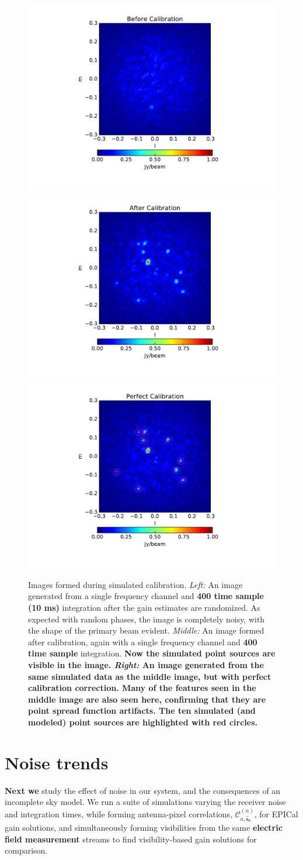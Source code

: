 \documentclass[a4paper,fleqn,usenatbib]{../mnras}
\newcommand{\spix}{\ensuremath{\hat{\mathbf{s}}_{0}}}
\newcommand{\Cna}[1][n]{\ensuremath{\mathcal{C}^{(#1)}_{a,\spix}}}
\begin{document}
\begin{figure}
\begin{center}
\includegraphics[width=.3\linewidth]{fig5a.pdf}
\includegraphics[width=.3\linewidth]{fig5b.pdf}
\includegraphics[width=.3\linewidth]{fig5c.pdf}
\caption{Images formed during simulated calibration. \emph{Left:} An image generated from a 
single frequency channel and \textbf{400 time sample (10 ms)} integration after the gain estimates are randomized. As 
expected with random phases, the image is completely noisy, with the shape of the primary 
beam evident. \emph{Middle:} An image formed after calibration, again with a single frequency 
channel and \textbf{400 time sample} integration. \textbf{Now the simulated point sources are visible in the image. 
\emph{Right:} An image generated from the same simulated data as the middle image, but 
with perfect calibration correction. Many of the features seen in the middle image are also
seen here, confirming that they are point spread function artifacts. The ten simulated (and modeled) point sources are highlighted with red circles.}
\label{fig:sim_images}
}
\end{center}
\end{figure}

\section{Noise trends}\label{sec:noise}
\textbf{Next we} study the effect of noise in our system, and the consequences 
of an incomplete sky model. We run a suite of simulations varying the receiver noise and 
integration times, while forming antenna-pixel correlations, $\Cna$, for EPICal gain solutions, 
and simultaneously forming visibilities from the same \textbf{electric field measurement} streams to find visibility-based 
gain solutions for comparison. 
\end{document}
